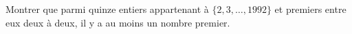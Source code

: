 Montrer que parmi quinze entiers appartenant à $\{2, 3, \ldots, 1992\}$ et premiers entre eux deux à deux, il y a au moins un nombre premier.
